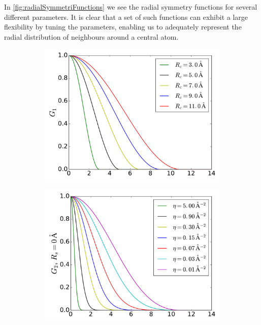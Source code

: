 \documentclass[twoside,english]{uiofysmaster}
\begin{document}
In \autoref{fig:radialSymmetriFunctions} we see the radial symmetry functions for several
different parameters. It is clear that a set of such functions can exhibit a large flexibility by tuning the parameters,
enabling us to adequately represent the radial distribution of neighbours around a central atom. 
\begin{figure}[h] 
  \begin{subfigure}[b]{0.5\linewidth}
    \centering
    \includegraphics[width=\linewidth]{Figures/Theory/G1.pdf} 
    \label{fig:radialSymmetriFunctions:a} 
    \vspace{1ex}
  \end{subfigure}%
  \begin{subfigure}[b]{0.5\linewidth}
    \centering
    \includegraphics[width=\linewidth]{Figures/Theory/G2_1.pdf} 

\end{subfigure}
\end{figure}
\end{document}
